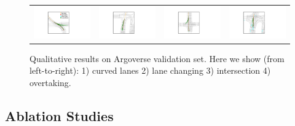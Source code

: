 \begin{figure}[t]
\vspace{-0.2cm}
\centering
\setlength{\tabcolsep}{1pt}
\begin{tabular}{cccc}
\includegraphics[width=0.24\linewidth]{figures/vis1.pdf}
&\includegraphics[width=0.24\linewidth]{figures/vis2.pdf}
&\includegraphics[width=0.24\linewidth]{figures/vis3.pdf}
&\includegraphics[width=0.24\linewidth]{figures/vis4.pdf}

\end{tabular}
\caption{Qualitative results on Argoverse validation set. Here we show (from
left-to-right): 1) curved lanes 2) lane changing 3) intersection 4) overtaking.}
\label{fig:vis}
\vspace{-0.2cm}
\end{figure}

\subsection{Ablation Studies}





